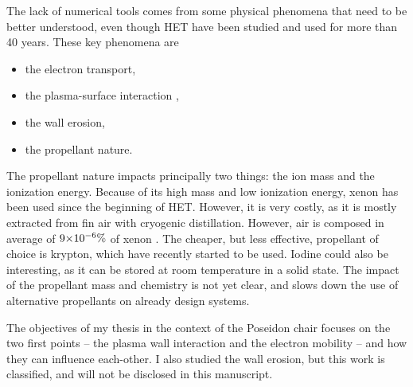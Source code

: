 The lack of numerical tools comes from some physical phenomena that need to be better understood, even though \ac{HET} have been studied and used for more than 40 years.
These key phenomena are \citep{samukawa2012,adamovich2017}
\begin{itemize}
  \item the electron transport,
  \item the plasma-surface interaction ,
  \item the wall erosion,
  \item the propellant nature.
\end{itemize}

\vspace{1em}
The propellant nature impacts principally two things\string: the ion mass and the ionization energy.
Because of its high mass and low ionization energy, xenon has been used since the beginning of \ac{HET}. 
However, it is very costly, as it is mostly extracted from fin air with cryogenic distillation.
However, air is composed in average of ${{9}{\times}10^{-6}}\%$ of xenon \citep{earthfacs}.
The cheaper, but less effective, propellant of choice is krypton, which have recently started to be used.
Iodine could also be interesting, as it can be stored at room temperature in a solid state.
The impact of the propellant mass and chemistry is not yet clear, and slows down the use of alternative propellants on already design systems.

\vspace{1em}
The objectives of my thesis in the context of the {\sc Poseidon} chair focuses on the two first points -- the plasma wall interaction and the electron mobility -- and how they can influence each-other.
I also studied the wall erosion, but this work is classified, and will not be disclosed in this manuscript.





